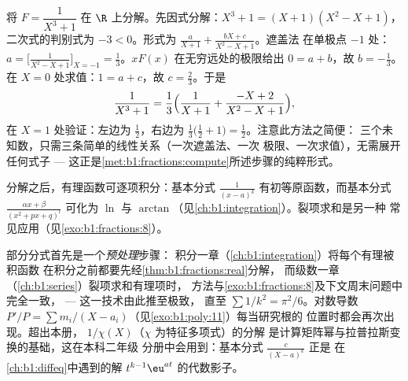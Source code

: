 \begin{example}[三次分母的完整计算]\label{ex:b1:fractions:cubic}
将 $F = \dfrac{1}{X^3 + 1}$ 在 $\R$ 上分解。先因式分解：$X^3 +
1 = (X + 1)(X^2 - X + 1)$，二次式的判别式为 $-3 <
0$。形式为 $\frac{a}{X+1} + \frac{bX + c}{X^2 - X + 1}$。遮盖法
在单极点 $-1$ 处：$a = \bigl[\frac1{X^2 - X +
1}\bigr]_{X=-1} = \frac13$。$xF(x)$ 在无穷远处的极限给出 $0 = a +
b$，故 $b = -\frac13$。在 $X = 0$ 处求值：$1 = a + c$，故 $c =
\frac23$。于是
\[
\frac{1}{X^3+1} = \frac13\Bigl(\frac{1}{X+1}
+ \frac{-X + 2}{X^2 - X + 1}\Bigr) ,
\]
在 $X = 1$ 处验证：左边为 $\frac12$，右边为
$\frac13\bigl(\frac12 + 1\bigr) = \frac12$。注意此方法之简便：
三个未知数，只需三条简单的线性关系（一次遮盖法、一次
极限、一次求值），无需展开任何式子 ---
这正是\cref{met:b1:fractions:compute}所述步骤的纯粹形式。
\end{example}

\begin{remark}[用途]
分解之后，有理函数可逐项积分：基本分式
$\frac{1}{(x-a)^k}$ 有初等原函数，而基本分式
$\frac{\alpha x + \beta}{(x^2 + px + q)^l}$ 可化为 $\ln$ 与
$\arctan$（见\cref{ch:b1:integration}）。裂项求和是另一种
常见应用（见\cref{exo:b1:fractions:8}）。
\end{remark}

\begin{remark}[本章的应用]\label{rem:b1:fractions:whereused}
部分分式首先是一个\emph{预处理}步骤：
积分一章（\cref{ch:b1:integration}）将每个有理被积函数
在积分之前都要先经\cref{thm:b1:fractions:real}分解，
而级数一章（\cref{ch:b1:series}）裂项求和有理项时，
方法与\cref{exo:b1:fractions:8}及下文周末问题中完全一致，
--- 这一技术由此推至极致，
直至 $\sum 1/k^2 = \pi^2/6$。对数导数 $P'/P = \sum
m_i/(X - a_i)$（见\cref{exo:b1:poly:11}）每当研究根的
位置时都会再次出现。超出本册，
$1/\chi(X)$（$\chi$ 为特征多项式）的分解
是计算矩阵幂与拉普拉斯变换的基础，这在本科二年级
分册中会用到：基本分式 $\frac{c}{(X - a)^k}$ 正是
在\cref{ch:b1:diffeq}中遇到的解 $t^{k-1}\eu^{at}$ 的代数影子。
\end{remark}

